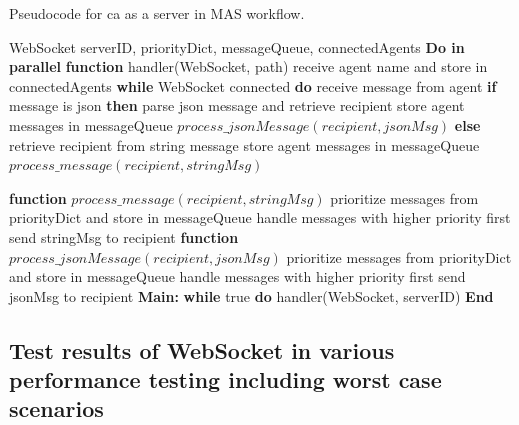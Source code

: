 \begin{breakablealgorithm}
    \caption{Pseudocode for \gls{ca} as a server in MAS workflow.}
    \label{alg: ServerPseudoCode}
    \begin{algorithmic}[1]
         WebSocket
         serverID, priorityDict, messageQueue, connectedAgents
        \State \textbf{Do in parallel}
        \State \textbf{\qquad function} handler(WebSocket, path)  
        \State \textbf \qquad \qquad receive agent name and store in connectedAgents
        \State \textbf {\qquad \qquad while} WebSocket connected \textbf{do} 
        \State \textbf \qquad \qquad \qquad receive message from agent   
        \State \textbf{\qquad \qquad \qquad if} {message is json} \textbf{then}
        \State \textbf \qquad \qquad \qquad \qquad parse json message and retrieve recipient
        \State \textbf \qquad \qquad \qquad \qquad store agent messages in messageQueue  
        \State \textbf \qquad \qquad \qquad \qquad $process\_jsonMessage(recipient, jsonMsg)$
        \State \textbf{\qquad \qquad \qquad else}  
        \State \textbf \qquad \qquad \qquad \qquad retrieve recipient from string message
        \State \textbf \qquad \qquad \qquad \qquad store agent messages in messageQueue  
        \State \textbf \qquad \qquad \qquad \qquad $process\_message(recipient, stringMsg)$
        
        \State \textbf{\qquad function} $process\_message(recipient, stringMsg)$   
        \State \textbf \qquad \qquad prioritize messages from priorityDict and store in messageQueue 
        \State \textbf \qquad \qquad handle messages with higher priority first   
        \State \textbf \qquad \qquad send stringMsg to recipient 
        \State \textbf{\qquad function} $process\_jsonMessage(recipient, jsonMsg)$   
        \State \textbf \qquad \qquad prioritize messages from priorityDict and store in messageQueue
        \State \textbf \qquad \qquad handle messages with higher priority first 
        \State \textbf \qquad \qquad send jsonMsg to recipient
        \State \textbf{Main:}   
        \State \textbf {\qquad while} true \textbf {do}
        \State \textbf \qquad \qquad handler(WebSocket, serverID) 
        \State \textbf{End}                 
    \end{algorithmic}
\end{breakablealgorithm}




\subsection{Test results of WebSocket in various performance testing including worst case scenarios} \label{chap: Result-WS}

